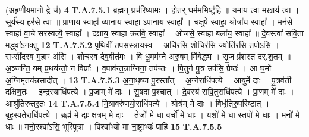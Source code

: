 \documentclass[17pt]{extarticle}
\begin{document}
                  \newline
                                                        (अहृ॑णीयमानो॒ द्वे च॑) \textbf{4} \newline \newline
                                \textbf{ T.A.7.5.1} \newline
                  ब्रह्म॒न् प्रच॑रिष्यामः । होत॑र् घ॒र्मम॒भिष्टु॑हि ॥ य॒माय॑ त्वा म॒खाय॑ त्वा । सूर्य॑स्य॒ हर॑से त्वा ॥ प्रा॒णाय॒ स्वाहा᳚ व्या॒नाय॒ स्वाहा॑ ऽपा॒नाय॒ स्वाहा᳚ ।  चक्षु॑षे॒ स्वाहा॒ श्रोत्रा॑य॒ स्वाहा᳚ । मन॑से॒ स्वाहा॑ वा॒चे सर॑स्वत्यै॒ स्वाहा᳚ । दक्षा॑य॒ स्वाहा॒ क्रत॑वे॒ स्वाहा᳚ । ओज॑से॒ स्वाहा॒ बला॑य॒ स्वाहा᳚ ॥  दे॒वस्त्वा॑ सवि॒ता मद्ध्वा॑ऽनक्तु \textbf{ 12} \newline
                  \newline
                                                                  \textbf{ T.A.7.5.2} \newline
                  पृ॒थि॒वीं तप॑सस्त्रायस्व । अ॒र्चिर॑सि शो॒चिर॑सि॒ ज्योति॑रसि॒ तपो॑ऽसि । सꣳसी॑दस्व म॒हाꣳ अ॑सि । शोच॑स्व देव॒वीत॑मः । वि धू॒मम॑ग्ने अरु॒षम् मि॑येद्ध्य । सृ॒ज प्र॑शस्त दर्.श॒तम् ॥  अ॒ञ्जन्ति॒ यम् प्र॒थय॑न्तो॒ न विप्राः᳚ । व॒पाव॑न्त॒न्नाग्निना॒ तप॑न्तः ।  पि॒तुर्न पु॒त्र उप॑सि॒ प्रेष्ठः॑ । आ घ॒र्मो अ॒ग्निमृ॒तय॑न्नसादीत् । \textbf{ 13} \newline
                  \newline
                                                                  \textbf{ T.A.7.5.3} \newline
                  अ॒ना॒धृ॒ष्या पु॒रस्ता᳚त् । अ॒ग्नेराधि॑पत्ये ।  आयु॑र्मे दाः । पु॒त्रव॑ती दक्षिण॒तः । इन्द्र॒स्याधि॑पत्ये । प्र॒जाम् मे॑ दाः । सु॒षदा॑ प॒श्चात् । दे॒वस्य॑ सवि॒तुराधि॑पत्ये । प्रा॒णम् मे॑ दाः । आश्रु॑तिरुत्तर॒तः \textbf{ 14} \newline
                  \newline
                                                                  \textbf{ T.A.7.5.4} \newline
                  मि॒त्रावरु॑णयो॒राधि॑पत्ये । श्रोत्र॑म् मे दाः । विधृ॑तिरु॒परि॑ष्टात् । बृह॒स्पते॒राधि॑पत्ये ।  ब्रह्म॑ मे दाः क्ष॒त्रम् मे॑ दाः । तेजो॑ मे धा॒ वर्चो॑ मे धाः । यशो॑ मे धा॒ स्तपो॑ मे धाः ।  मनो॑ मे धाः ॥ मनो॒रश्वा॑ऽसि॒ भूरि॑पुत्रा ।  विश्वा᳚भ्यो मा ना॒ष्ट्राभ्यः॑ पाहि \textbf{ 15} \newline
                  \newline
                                                                  \textbf{ T.A.7.5.5} \newline
\end{document}
